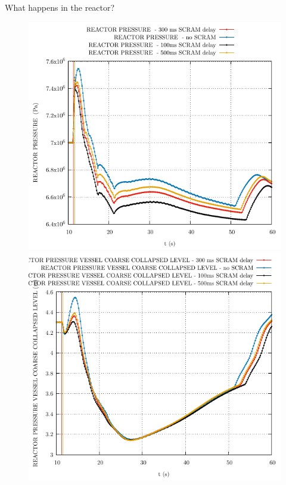 \begin{frame}{What happens in the reactor?}
	
	\begin{figure}
		\centering
		\begin{minipage}{.5\textwidth}
			\centering
			\includegraphics[width=0.7\linewidth]{./graphs/REACTOR PRESSURE _comp.pdf}
		\end{minipage}%
		\begin{minipage}{.5\textwidth}
			\centering
			\includegraphics[width=.7\linewidth]{./graphs/REACTOR PRESSURE VESSEL COARSE COLLAPSED LEVEL_comp.pdf}
		\end{minipage}
	\end{figure}
	\vspace{-10pt}
	\begin{figure}
		\centering
		\begin{minipage}{.5\textwidth}

\end{minipage}
\end{figure}
\end{frame}
